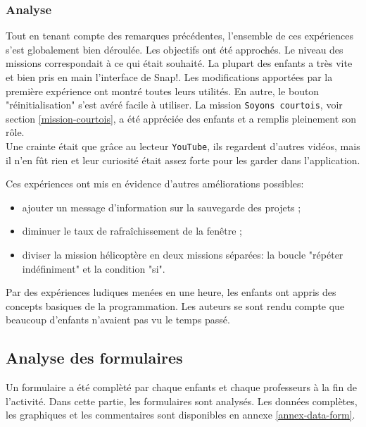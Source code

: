 \subsubsection{Analyse}
\label{analyse-scienceinfuse}
Tout en tenant compte des remarques précédentes, l'ensemble de ces expériences s'est globalement bien déroulée. Les objectifs ont été approchés. Le niveau des missions correspondait à ce qui était souhaité. La plupart des enfants a très vite et bien pris en main l'interface de Snap!. Les modifications apportées par la première expérience ont montré toutes leurs utilités. En autre, le bouton "réinitialisation" s'est avéré facile à utiliser. La mission \texttt{Soyons courtois}, voir section \ref{mission-courtois}, a été appréciée des enfants et a remplis pleinement son rôle.\\

Une crainte était que grâce au lecteur \texttt{YouTube}, ils regardent d'autres vidéos, mais il n'en fût rien et leur curiosité était assez forte pour les garder dans l'application.

Ces expériences ont mis en évidence d'autres améliorations possibles: 
\begin{itemize}
  \item ajouter un message d'information sur la sauvegarde des projets ;
  \item diminuer le taux de rafraîchissement de la fenêtre ;
  \item diviser la mission hélicoptère en deux missions séparées: la boucle "répéter indéfiniment" et la condition "si".
\end{itemize}

Par des expériences ludiques menées en une heure, les enfants ont appris des concepts basiques de la programmation. Les auteurs se sont rendu compte que beaucoup d'enfants n'avaient pas vu le temps passé.

\subsection{Analyse des formulaires}
\label{analyse-exp}
Un formulaire a été complèté par chaque enfants et chaque professeurs à la fin de l'activité. Dans cette partie, les formulaires sont analysés. Les données complètes, les graphiques et les commentaires sont disponibles en annexe \ref{annex-data-form}.


